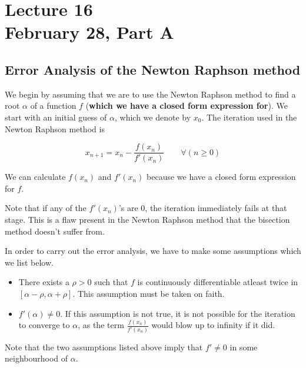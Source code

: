 \chapter*{Lecture 16 \\ February 28, Part A}
\setcounter{chapter}{16}
\setcounter{section}{0}
\setcounter{figure}{0}

\section{Error Analysis of the Newton Raphson method}

We begin by assuming that we are to use the Newton Raphson method to find a root $\alpha$ of a function $f$ (\textbf{which we have a closed form expression for}). We start with an initial guess of $\alpha$, which we denote by $x_0$.
The iteration used in the Newton Raphson method is
\begin{defn}
  \label{feb28:def:iter}
  \[
    x_{n+1} = x_n - \frac{f(x_n)}{f'(x_n)} \qquad \forall(n \geq 0)
  \]
\end{defn}
We can calculate $f(x_n)$ and $f'(x_n)$ because we have a closed form expression for $f$.

Note that if any of the $f'(x_n)$'s are 0, the iteration immediately fails at that stage. This is a flaw present in the Newton Raphson method that the bisection method doesn't suffer from.

In order to carry out the error analysis, we have to make some assumptions which we list below.
\begin{itemize}
\item
  There exists a $\rho > 0$ such that $f$ is continuously differentiable atleast twice in $[\alpha - \rho, \alpha + \rho]$. This assumption must be taken on faith.
\item
  $f'(\alpha) \neq 0$. If this assumption is not true, it is not possible for the iteration to converge to $\alpha$, as the term $\frac{f(x_n)}{f'(x_n)}$ would blow up to infinity if it did.
\end{itemize}

Note that the two assumptions listed above imply that $f' \neq 0$ in some neighbourhood of $\alpha$.

